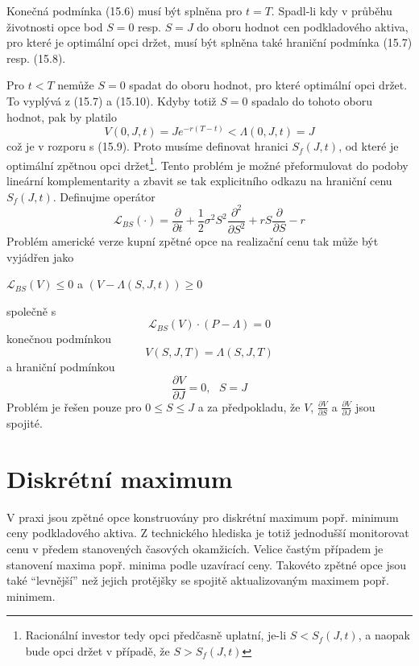 \documentclass[a4paper]{book}
\begin{document}
Konečná podmínka (15.6) musí být splněna pro $t = T$. Spadl-li kdy v průběhu životnosti opce bod $S = 0$ resp. $S = J$ do oboru hodnot cen podkladového aktiva, pro které je optimální opci držet, musí být splněna také hraniční podmínka (15.7) resp. (15.8).

Pro $t < T$ nemůže $S = 0$ spadat do oboru hodnot, pro které optimální opci držet. To vyplývá z (15.7) a (15.10). Kdyby totiž $S = 0$ spadalo do tohoto oboru hodnot, pak by platilo
\begin{equation*}
V(0, J, t) = Je^{-r(T-t)} < \Lambda(0, J, t) = J
\end{equation*}
což je v rozporu s (15.9). Proto musíme definovat hranici $S_f(J,t)$, od které je optimální zpětnou opci držet\footnote{Racionální investor tedy opci předčasně uplatní, je-li $S < S_f(J,t)$, a naopak bude opci držet v případě, že $S > S_f(J,t)$}. Tento problém je možné přeformulovat do podoby lineární komplementarity a zbavit se tak explicitního odkazu na hraniční cenu $S_f(J,t)$. Definujme operátor
\begin{equation*}
\mathcal{L}_{BS}(\cdot) = \frac{\partial}{\partial t} + \frac{1}{2}\sigma^2 S^2 \frac{\partial^2}{\partial S^2} + rS \frac{\partial}{\partial S} - r
\end{equation*}
Problém americké verze kupní zpětné opce na realizační cenu tak může být vyjádřen jako
\begin{center}
$\mathcal{L}_{BS}(V) \le 0$ a $(V - \Lambda(S,J,t)) \ge 0$
\end{center}
společně s
\begin{equation*}
\mathcal{L}_{BS}(V) \cdot (P - \Lambda) = 0
\end{equation*}
konečnou podmínkou
\begin{equation*}
V(S, J, T) = \Lambda(S, J, T)
\end{equation*}
a hraniční podmínkou
\begin{equation*}
\frac{\partial V}{\partial J} = 0, ~~~ S = J
\end{equation*}
Problém je řešen pouze pro $0 \le S \le J$ a za předpokladu, že $V$, $\frac{\partial V}{\partial S}$ a $\frac{\partial V}{\partial J}$ jsou spojité.

\section{Diskrétní maximum}

V praxi jsou zpětné opce konstruovány pro diskrétní maximum popř. minimum ceny podkladového aktiva. Z technického hlediska je totiž jednodušší monitorovat cenu v předem stanovených časových okamžicích. Velice častým případem je stanovení maxima popř. minima podle uzavírací ceny. Takovéto zpětné opce jsou také ``levnější'' než jejich protějšky se spojitě aktualizovaným maximem popř. minimem.
\end{document}
